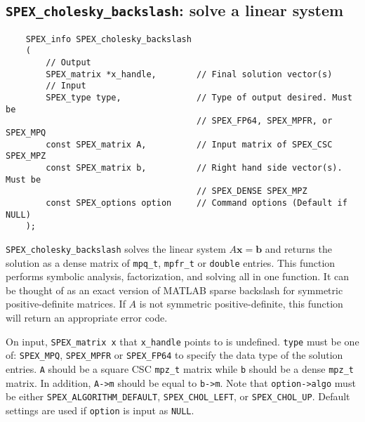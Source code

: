 \documentclass[12pt,oneside]{book}
\theoremstyle{definition}
\renewcommand{\b}{\mathbf{b}}
\newcommand{\x}{\mathbf{x}}
\begin{document}
\subsection{\texttt{SPEX\_cholesky\_backslash}: solve a linear system}
\label{ss:SPEX_Chol_backslash}
\begin{mdframed}[userdefinedwidth=\textwidth]
{\footnotesize
\begin{verbatim}
    SPEX_info SPEX_cholesky_backslash
    (
        // Output
        SPEX_matrix *x_handle,        // Final solution vector(s)
        // Input
        SPEX_type type,               // Type of output desired. Must be
                                      // SPEX_FP64, SPEX_MPFR, or SPEX_MPQ
        const SPEX_matrix A,          // Input matrix of SPEX_CSC SPEX_MPZ
        const SPEX_matrix b,          // Right hand side vector(s). Must be
                                      // SPEX_DENSE SPEX_MPZ 
        const SPEX_options option     // Command options (Default if NULL)
    );
\end{verbatim}
} \end{mdframed}

\verb|SPEX_cholesky_backslash| solves the linear system $A \x=\b$ and returns the solution
as a dense matrix of \verb|mpq_t|, \verb|mpfr_t| or \verb|double| entries. This
function performs symbolic analysis, factorization, and solving all in one function. 
It can be thought of as an exact version of MATLAB sparse backslash for symmetric positive-definite matrices.
If $A$ is not symmetric positive-definite, this function will return an appropriate error code.

On input, \verb|SPEX_matrix x| that \verb|x_handle| points to is undefined. \verb|type| must be one of:
\verb|SPEX_MPQ|, \verb|SPEX_MPFR| or \verb|SPEX_FP64| to specify the data type
of the solution entries. \verb|A| should be a square CSC \verb|mpz_t| matrix
while \verb|b| should be a dense \verb|mpz_t| matrix. In addition, \verb|A->m|
should be equal to \verb|b->m|. Note that \verb|option->algo| must be either 
\verb|SPEX_ALGORITHM_DEFAULT|, \verb|SPEX_CHOL_LEFT|, or \verb|SPEX_CHOL_UP|.
Default settings are used if
\verb|option| is input as \verb|NULL|.
\end{document}
